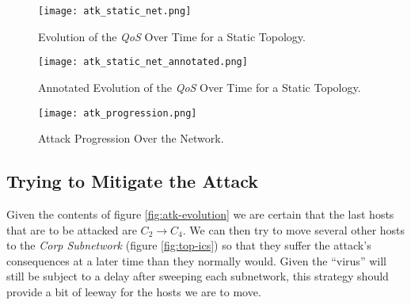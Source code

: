             \begin{sidewaysfigure}
                \centering
                \texttt{[image: atk\_static\_net.png]}
                \caption[\textit{QoS} on a Static Topology]{Evolution of the \textit{QoS} Over Time for a Static Topology.}
                \label{fig:static-atk}
            \end{sidewaysfigure}

            \begin{sidewaysfigure}
                \centering
                \texttt{[image: atk\_static\_net\_annotated.png]}
                \caption[Annotated \textit{QoS} on a Static Topology]{Annotated Evolution of the \textit{QoS} Over Time for a Static Topology.}
                \label{fig:static-atk-annotated}
            \end{sidewaysfigure}

            \begin{sidewaysfigure}
                \centering
                \texttt{[image: atk\_progression.png]}
                \caption[Attack Progression]{Attack Progression Over the Network.}
                \label{fig:atk-progression}
            \end{sidewaysfigure}

            

        \subsection{Trying to Mitigate the Attack}
            Given the contents of figure \ref{fig:atk-evolution} we are certain that the last hosts that are to be attacked are $C_2 \to C_4$. We can then try to move several other hosts to the \textit{Corp Subnetwork} (figure \ref{fig:top-ics}) so that they suffer the attack's consequences at a later time than they normally would. Given the ``virus'' will still be subject to a delay after sweeping each subnetwork, this strategy should provide a bit of leeway for the hosts we are to move.\\

